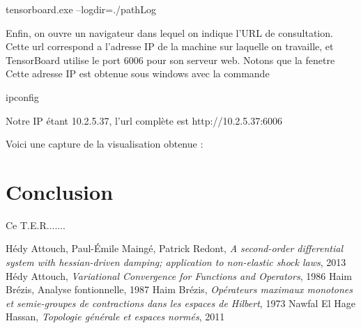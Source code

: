 \documentclass[a4paper,11pt]{book}
\theoremstyle{theo}
\begin{document}
\begin{mybash}
tensorboard.exe --logdir=./pathLog
\end{mybash}

Enfin, on ouvre un navigateur dans lequel on indique l'URL de consultation. Cette url correspond a l'adresse IP de la machine sur laquelle on travaille, et TensorBoard utilise le port 6006 pour son serveur web. Notons que la fenetre
Cette adresse IP est obtenue sous windows avec la commande 
\begin{mybash}
ipconfig
\end{mybash}

Notre IP étant 10.2.5.37, l'url complète est http://10.2.5.37:6006

Voici une capture de la visualisation obtenue :


\chapter*{Conclusion}
Ce T.E.R....... 
\newpage
\begin{thebibliography}{9}
Hédy Attouch, Paul-\'Emile Maingé, Patrick Redont, \emph{A second-order differential system with hessian-driven damping; application to non-elastic shock laws}, 2013
Hédy Attouch, \emph{Variational Convergence for Functions and Operators}, 1986
Haim Brézis, Analyse fontionnelle, 1987
Haim Brézis, \emph{Opérateurs maximaux monotones et semie-groupes de contractions dans les espaces de Hilbert}, 1973
Nawfal El Hage Hassan, \emph{Topologie générale et espaces normés}, 2011
\end{thebibliography}

\end{document}
